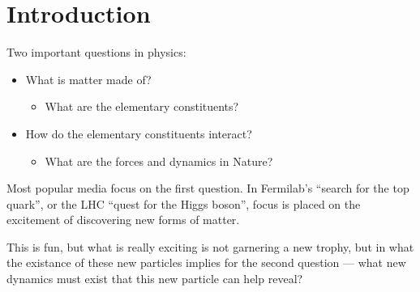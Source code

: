\section{Introduction}

Two important questions in physics:
\begin{itemize}
\item What is matter made of?
  \begin{itemize}
  \item What are the elementary constituents?
  \end{itemize}
\item How do the elementary constituents interact?
  \begin{itemize}
  \item What are the forces and dynamics in Nature?
  \end{itemize}
\end{itemize}

Most popular media focus on the first question. In Fermilab's ``search for the top quark'', or the LHC ``quest for the Higgs boson'', focus is placed on the excitement of discovering new forms of matter.

This is fun, but what is really exciting is not garnering a new trophy, but in what the existance of these new particles implies for the second question --- what new dynamics must exist that this new particle can help reveal?


